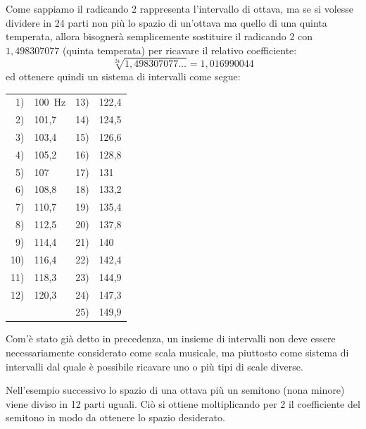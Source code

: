 Come sappiamo il radicando 2 rappresenta l'intervallo di ottava, ma se si
volesse dividere in 24 parti non più lo spazio di un'ottava ma quello di una
quinta temperata, allora bisognerà semplicemente sostituire il radicando 2 con
$1{,}498307077$ (quinta temperata) per ricavare il relativo coefficiente:
\[
  \sqrt[24]{1{,}498307077\ldots} = 1{,}016990044
\]
ed ottenere quindi un sistema di intervalli come segue:

\begin{center}\small
\begin{tabular}{r l@{\qquad\qquad}r l}
 1) & 100~Hz & 13) & 122{,}4 \\
 2) & 101{,}7 & 14) & 124{,}5 \\
 3) & 103{,}4 & 15) & 126{,}6 \\
 4) & 105{,}2 & 16) & 128{,}8 \\
 5) & 107     & 17) & 131     \\
 6) & 108{,}8 & 18) & 133{,}2 \\
 7) & 110{,}7 & 19) & 135{,}4 \\
 8) & 112{,}5 & 20) & 137{,}8 \\
 9) & 114{,}4 & 21) & 140     \\
10) & 116{,}4 & 22) & 142{,}4 \\
11) & 118{,}3 & 23) & 144{,}9 \\
12) & 120{,}3 & 24) & 147{,}3 \\
    &         & 25) & 149{,}9 \\
\end{tabular}
\end{center}

Com'è stato già detto in precedenza, un insieme di intervalli non deve essere
necessariamente considerato come scala musicale, ma piuttosto come sistema di
intervalli dal quale è possibile ricavare uno o più tipi di scale diverse.

Nell'esempio successivo lo spazio di una ottava più un semitono (nona minore)
viene diviso in 12 parti uguali. Ciò si ottiene moltiplicando per 2 il
coefficiente del semitono in modo da ottenere lo spazio desiderato.

\begin{figure}[htbp]
  \centering
\end{figure}

